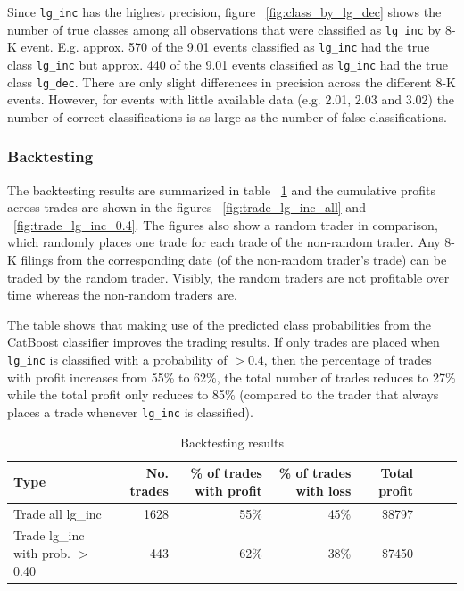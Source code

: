 \documentclass{article}
\begin{document}
 	Since \lstinline{lg_inc} has the highest precision, figure ~\ref{fig:class_by_lg_dec} shows the number of true classes among all observations that were classified as \lstinline{lg_inc} by 8-K event. E.g. approx. 570 of the 9.01 events classified as \lstinline{lg_inc} had the true class \lstinline{lg_inc} but approx. 440 of the 9.01 events classified as \lstinline{lg_inc} had the true class \lstinline{lg_dec}. There are only slight differences in precision across the different 8-K events. However, for events with little available data (e.g. 2.01, 2.03 and 3.02) the number of correct classifications is as large as the number of false classifications.

	\subsubsection{Backtesting}

	The backtesting results are summarized in table ~\ref{table:results_trading} and the cumulative profits across trades are shown in the figures ~\ref{fig:trade_lg_inc_all} and ~\ref{fig:trade_lg_inc_0.4}. The figures also show a random trader in comparison, which randomly places one trade for each trade of the non-random trader. Any 8-K filings from the corresponding date (of the non-random trader's trade) can be traded by the random trader. Visibly, the random traders are not profitable over time whereas the non-random traders are.
	
	The table shows that making use of the predicted class probabilities from the CatBoost classifier improves the trading results. If only trades are placed when \lstinline{lg_inc} is classified with a probability of $>0.4$, then the percentage of trades with profit increases from 55\% to 62\%, the total number of trades reduces to 27\% while the total profit only reduces to 85\% (compared to the trader that always places a trade whenever \lstinline{lg_inc} is classified).
	

	\begin{table}[h!]
		\centering
		\caption{Backtesting results}
		\label{table:results_trading}
		
		\begin{tabular}{lrrrrrrr}
			\toprule
			Type &    No. trades &  \% of trades with profit &     \% of trades with loss &     Total profit \\
			\midrule
			Trade all lg\_inc  &  1628 &  55\% &   45\% & \$8797 \\
			Trade lg\_inc with prob. $>$ 0.40  & 443 & 62\% &  38\% &  \$7450 \\
			\bottomrule
		\end{tabular}
		
	\end{table}%
\end{document}
